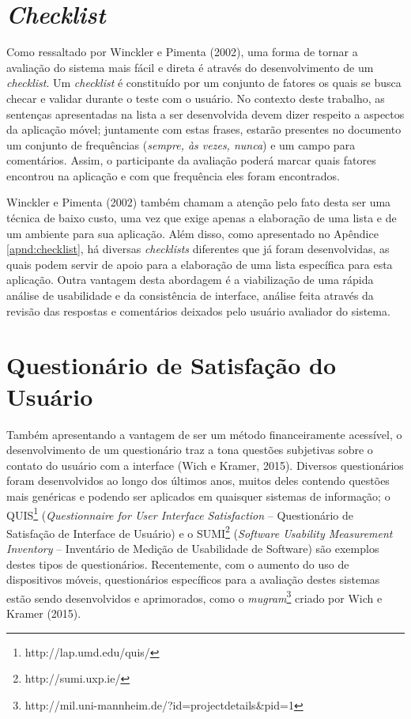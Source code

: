 \section{\emph{Checklist}}

Como ressaltado por Winckler e Pimenta (2002), uma forma de tornar a avaliação do sistema mais fácil e direta é através do desenvolvimento de um \emph{checklist}. Um \emph{checklist} é constituído por um conjunto de fatores os quais se busca checar e validar durante o teste com o usuário. No contexto deste trabalho, as sentenças apresentadas na lista a ser desenvolvida devem dizer respeito a aspectos da aplicação móvel; juntamente com estas frases, estarão presentes no documento um conjunto de frequências (\emph{sempre, às vezes, nunca}) e um campo para comentários. Assim, o participante da avaliação poderá marcar quais fatores encontrou na aplicação e com que frequência eles foram encontrados.

Winckler e Pimenta (2002) também chamam a atenção pelo fato desta ser uma técnica de baixo custo, uma vez que exige apenas a elaboração de uma lista e de um ambiente para sua aplicação. Além disso, como apresentado no Apêndice \ref{apnd:checklist}, há diversas \emph{checklists} diferentes que já foram desenvolvidas, as quais podem servir de apoio para a elaboração de uma lista específica para esta aplicação. Outra vantagem desta abordagem é a viabilização de uma rápida análise de usabilidade e da consistência de interface, análise feita através da revisão das respostas e comentários deixados pelo usuário avaliador do sistema.

\section{Questionário de Satisfação do Usuário}
Também apresentando a vantagem de ser um método financeiramente acessível, o desenvolvimento de um questionário traz a tona questões subjetivas sobre o contato do usuário com a interface (Wich e Kramer, 2015). Diversos questionários foram desenvolvidos ao longo dos últimos anos, muitos deles contendo questões mais genéricas e podendo ser aplicados em quaisquer sistemas de informação; o QUIS\footnote{http://lap.umd.edu/quis/} (\emph{Questionnaire for User Interface Satisfaction} -- Questionário de Satisfação de Interface de Usuário) e o SUMI\footnote{http://sumi.uxp.ie/} (\emph{Software Usability Measurement Inventory} -- Inventário de Medição de Usabilidade de Software) são exemplos destes tipos de questionários. Recentemente, com o aumento do uso de dispositivos móveis, questionários específicos para a avaliação destes sistemas estão sendo desenvolvidos e aprimorados, como o \emph{mugram}\footnote{http://mil.uni-mannheim.de/?id=projectdetails\&pid=1} criado por Wich e Kramer (2015).

